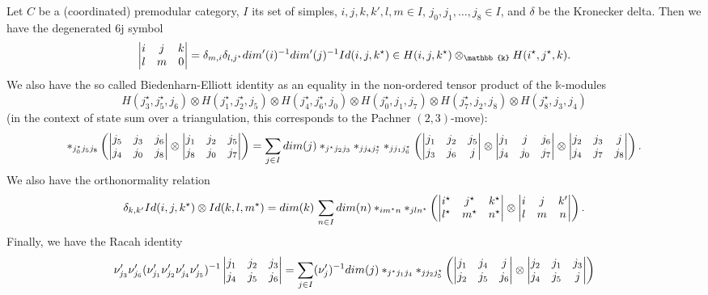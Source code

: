 \begin{proposition}\label{prop/basic-equalities-of-6j-symbols}
  Let $C$ be a (coordinated) premodular category, $I$ its set of
  simples, $i, j, k, k', l, m \in I$,
  $j_{0}, j_{1}, \ldots, j_{8} \in I$, and $\delta$ be the Kronecker
  delta. Then we have the degenerated $6$j symbol
  \begin{equation}\label{eqn/degenerated-6j}
    \normalizedSixJSymbol{i}{j}{k}{l}{m}{0} = \delta_{m,i} \delta_{l,j^{\star}}dim'(i)^{-1}dim'(j)^{-1}Id(i,j,k^{\star})
    \in H(i,j,k^{\star}) \otimes_{\mathbb{k}} H(i^{\star}, j^{\star}, k)
    .
  \end{equation}
  We also have the so called Biedenharn-Elliott identity as an
  equality in the non-ordered tensor product of the
  $\mathbb{k}$-modules
  $$
  H(j_{3}^{\star}, j_{5}^{\star}, j_{6}) \otimes
  H(j_{1}^{\star}, j_{2}^{\star}, j_{5}) \otimes
  H(j_{4}^{\star}, j_{6}^{\star}, j_{0}) \otimes
  H(j_{0}^{\star}, j_{1}, j_{7}) \otimes
  H(j_{7}^{\star}, j_{2}, j_{8}) \otimes
  H(j_{8}^{\star}, j_{3}, j_{4})
  $$
  (in the context of state sum over a triangulation, this
  corresponds to the Pachner $(2,3)$-move):
  \begin{equation}\label{eqn/Biedenharn-Elliot-identity}
    \ast_{j_{0}^{\star}j_{5}j_{8}}
    \left(
      \begin{vmatrix} j_{5} & j_{3} & j_{6} \\ j_{4} & j_{0} & j_{8} \\ \end{vmatrix} \otimes \begin{vmatrix} j_{1} & j_{2} & j_{5} \\ j_{8} & j_{0} & j_{7} \\ \end{vmatrix}
    \right)
    =
    \sum_{j \in I} dim(j)
    \ast_{j^{\star}j_{2}j_{3}}\ast_{jj_{4}j_{7}^{\star}}\ast_{jj_{1}j_{6}^{\star}}
    \left(
      \begin{vmatrix} j_{1} & j_{2} & j_{5} \\ j_{3} & j_{6} & j \\ \end{vmatrix} \otimes
      \begin{vmatrix} j_{1} & j & j_{6} \\ j_{4} & j_{0} & j_{7} \\ \end{vmatrix} \otimes
      \begin{vmatrix} j_{2} & j_{3} & j \\ j_{4} & j_{7} & j_{8} \\ \end{vmatrix}
    \right).
  \end{equation}
  We also have the orthonormality relation
  \begin{equation}\label{eqn/orthonormality-relation}
    \delta_{k,k'} Id(i,j,k^{\star}) \otimes Id(k,l,m^{\star})
    =
    dim(k)\,\sum_{n \in I} dim(n) \ast_{im^{\star}n} \ast_{jln^{\star}}
    \left(
      \begin{vmatrix} i^{\star} & j^{\star} & k^{\star} \\ l^{\star} & m^{\star} & n^{\star} \\ \end{vmatrix} \otimes
      \begin{vmatrix} i & j & k' \\ l & m & n \\ \end{vmatrix}
    \right).
  \end{equation}
  Finally, we have the Racah identity
  \begin{equation}\label{eqn/Racah-identity}
    \nu'_{j_{3}} \nu'_{j_{6}} (\nu'_{j_{1}} \nu'_{j_{2}} \nu'_{j_{4}} \nu'_{j_{5}})^{-1}
    \begin{vmatrix} j_{1} & j_{2} & j_{3} \\ j_{4} & j_{5} & j_{6} \\ \end{vmatrix}
    =
    \sum_{j \in I} (\nu'_{j})^{-1} dim(j) \ast_{j^{\star}j_{1}j_{4}} \ast_{jj_{2}j_{5}^{\star}}
    \left(
      \begin{vmatrix} j_{1} & j_{4} & j \\ j_{2} & j_{5} & j_{6} \\ \end{vmatrix} \otimes
      \begin{vmatrix} j_{2} & j_{1} & j_{3} \\ j_{4} & j_{5} & j \\ \end{vmatrix}
    \right)
  \end{equation}
\end{proposition}

